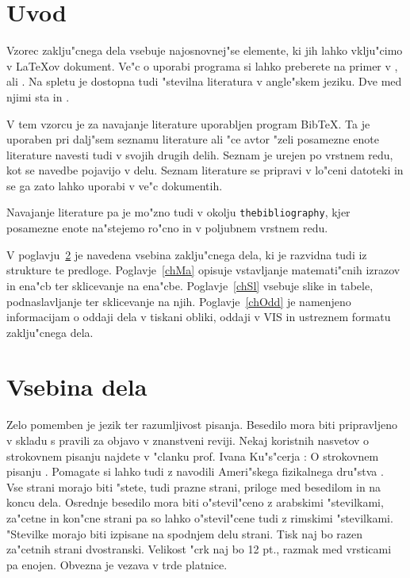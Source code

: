 %
\chapter{Uvod}
\label{chUv}
Vzorec zaklju"cnega dela vsebuje najosnovnej"se elemente, 
ki jih lahko vklju"cimo v \LaTeX{}ov dokument. 
Ve"c o uporabi programa si lahko preberete na primer v 
\cite{Go}, \cite{Ba} ali \cite{Ra}. Na spletu je dostopna 
tudi "stevilna literatura v angle"skem jeziku. 
Dve med njimi sta \cite{ams}  in \cite{Gr}.

V tem vzorcu je za navajanje literature uporabljen program Bib\TeX. 
Ta je uporaben pri dalj"sem seznamu literature ali "ce avtor "zeli 
posamezne enote literature navesti tudi v svojih drugih delih. 
Seznam je urejen po vrstnem redu, kot se navedbe pojavijo v delu.
Seznam literature se pripravi v lo"ceni datoteki in se ga zato 
lahko uporabi v ve"c dokumentih.


Navajanje literature pa je mo"zno tudi v okolju {\tt thebibliography},
kjer posamezne enote na"stejemo ro"cno in v poljubnem vrstnem redu.

V poglavju~\ref{chVse} je navedena vsebina zaklju"cnega dela, ki je razvidna tudi iz strukture te predloge.
Poglavje~\ref{chMa} opisuje vstavljanje matemati"cnih izrazov in ena"cb ter sklicevanje na ena"cbe. 
Poglavje~\ref{chSl} vsebuje slike in tabele, podnaslavljanje ter sklicevanje na njih.
Poglavje~\ref{chOdd} je namenjeno informacijam o oddaji dela v tiskani obliki, oddaji v \ac{VIS} in ustreznem formatu zaklju"cnega dela.

%
\chapter{Vsebina dela}
\label{chVse}

Zelo pomemben je jezik ter razumljivost pisanja. Besedilo mora biti pripravljeno v skladu s pravili za objavo v znanstveni reviji.
Nekaj koristnih nasvetov o strokovnem pisanju najdete v "clanku prof. Ivana Ku"s"cerja : O strokovnem pisanju \cite{Ku}. 
Pomagate si lahko tudi z navodili Ameri"skega fizikalnega dru"stva \cite{APS}.\\

Vse strani morajo biti "stete, tudi prazne strani, priloge med besedilom in na koncu dela. 
Osrednje besedilo mora biti o"stevil"ceno z arabskimi "stevilkami, za"cetne in kon"cne strani pa so lahko o"stevil"cene tudi z rimskimi "stevilkami. 
"Stevilke morajo biti izpisane na spodnjem delu strani. Tisk naj bo razen za"cetnih strani dvostranski. Velikost "crk naj bo 12 pt., razmak med vrsticami pa enojen. 
Obvezna je vezava v trde platnice.\\

